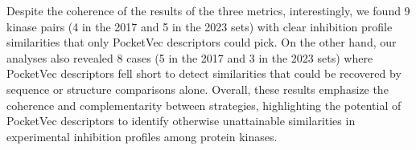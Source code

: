 Despite the coherence of the results of the three metrics, interestingly, we found 9 kinase pairs (4 in the 2017 and 5 in the 2023 sets) with clear inhibition profile similarities that only PocketVec descriptors could pick. On the other hand, our analyses also revealed 8 cases (5 in the 2017 and 3 in the 2023 sets) where PocketVec descriptors fell short to detect similarities that could be recovered by sequence or structure comparisons alone. Overall, these results emphasize the coherence and complementarity between strategies, highlighting the potential of PocketVec descriptors to identify otherwise unattainable similarities in experimental inhibition profiles among protein kinases. 